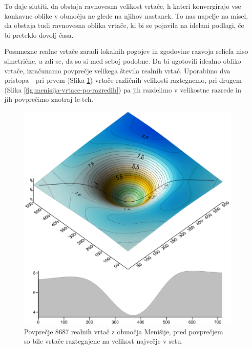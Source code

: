 \documentclass[a4paper, oneside, 12pt]{book}
\begin{document}
  To daje slutiti, da obstaja ravnovesna velikost vrtače, h kateri konvergirajo vse konkavne oblike v območju ne glede na njihov nastanek.
  To nas napelje na misel, da obstaja tudi ravnovesna oblika vrtače, ki bi se pojavila na idelani podlagi, če bi preteklo dovolj časa.

  Posamezne realne vrtače zaradi lokalnih pogojev in zgodovine razvoja reliefa niso simetrične, a zdi se, da so si med seboj podobne. Da bi ugotovili idealno obliko vrtače, izračunamo povprečje velikega števila realnih vrtač. Uporabimo dva pristopa - pri prvem (Slika \ref{fig:menisija-vrtaca}) vrtače različnih velikosti raztegnemo, pri drugem (Slika \ref{fig:menisija-vrtace-po-razredih}) pa jih razdelimo v velikostne razrede in jih povprečimo znotraj le-teh. 

  \begin{figure}[H]
    \centering
    \includegraphics[width=13cm]{slike/menisija-vrtaca}
    \caption{Povprečje 8687 realnih vrtač z območja Menišije, pred povprečjem so bile vrtače raztegnjene na velikost največje v setu.}
    \label{fig:menisija-vrtaca}
  \end{figure}
\end{document}
